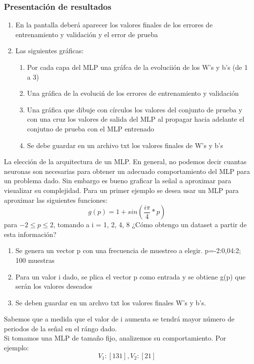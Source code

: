 \documentclass{article}
\begin{document}
\subsubsection{Presentación de resultados}
\begin{enumerate}
	\item En la pantalla deberá aparecer los valores finales de los errores de entrenamiento y validación y el error de prueba
	\item Las siguientes gráficas:
	\begin{enumerate}
		\item Por cada capa del MLP una gráfca de la evoluciión de los W's y b's (de 1 a 3)
		\item Una gráfica de la evoluciń de los errores de entrenamiento y validación
		\item Una gráfica que dibuje con círculos los valores del conjunto de prueba y con una cruz los valores de salida del MLP al propagar hacia adelante el conjutno de prueba con el MLP entrenado
		\item Se debe guardar en un archivo txt los valores finales de W's y b's
	\end{enumerate}
\end{enumerate}
La elección de la arquitectura de un MLP. En general, no podemos decir cuantas neuronas son necesarias para obtener un adecuado comportamiento del MLP para un problema dado. Sin embargo es bueno graficar la señal a aproximar para visualizar su complejidad.
Para un primer ejemplo se desea usar un MLP para aproximar las siguientes funciones:
 $$ g(p) = 1 + sin(\frac{i \pi}{4} * p) $$
 para $-2 \le p \le 2$, tomando a i = 1, 2, 4, 8
 ¿Cómo obtengo un dataset a partir de esta información?
 \begin{enumerate}
 	\item Se genera un vector p con una frecuencia de muestreo a elegir. p=-2:0,04:2; 100 muestras
 	\item Para un valor i dado, se plica el vector p como entrada y se obtiene g(p) que serán los valores deseados
 	\item  Se deben guardar en un archvo txt los valores finales W's y b's.
 \end{enumerate}
 Sabemos que a medida que el valor de i aumenta se tendrá mayor número de periodos de la señal en el rángo dado.\\
 
 Si tomamos una MLP de tamaño fijo, analizemos su comportamiento. Por ejemplo:
 $$ V_1: [1 3 1], V_2: [2 1] $$
\end{document}
